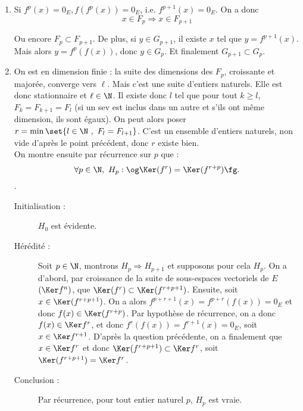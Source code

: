 \begin{enumerate}
\item Si $f^p(x)=0_E, f\left(f^p(x)\right)=0_E$, i.e. $f^{p+1}(x)=0_E$. On a donc
$$
x \in F_p \Longrightarrow x \in F_{p+1}
$$

Ou encore $F_p \subset F_{p+1}$.
De plus, si $y \in G_{p+1}$, il existe $x$ tel que $y=f^{p+1}(x)$. Mais alors $y=f^p(f(x))$, donc $y \in G_p$. Et finalement $G_{p+1} \subset G_p$.
\item On est en dimension finie : la suite des dimensions des $F_p$, croissante et majorée, converge vers $\ell$. Mais c'est une suite d'entiers naturels. Elle est donc stationnaire et $\ell\in\N$. Il existe donc $l$ tel que pour tout $k\geq l$, $F_k=F_{k+1}=F_l$ (si un sev est inclus dans un autre et s'ils ont même dimension, ils sont égaux).
On peut alors poser $r=\min\set{l\in\N\ ,\ F_l=F_{l+1}}$. C'est un ensemble d'entiers naturels, non vide d'après le point précédent, donc $r$ existe bien.\\
On montre ensuite par récurrence sur $p$ que :
      \[ \forall p\in\N,~H_p:\textrm{\og} \Ker(f^r) =\Ker(f^{r+p})\textrm{\fg}.
    \].
    \begin{description}
      \item[Initialisation :] $H_0$ est évidente.
      \item[Hérédité :] Soit $p\in \N$, montrons $H_p\Rightarrow H_{p+1}$ et supposons pour cela $H_p$. On a d'abord, par croissance de la suite de sous-espaces vectoriels de $E$ $(\Ker f^n)$, que $ \Ker(f^r) \subset \Ker(f^{r+p+1})$. Ensuite, soit $x\in\Ker(f^{r+p+1})$. On a alors $f^{p+r+1}(x) = f^{p+r}(f(x)) = 0_E$ et donc $f(x) \in \Ker(f^{r+p})$. Par hypothèse de récurrence, on a donc $f(x) \in \Ker f^r$, et donc $f^{r}(f(x)) = f^{r+1}(x) = 0_E$, soit $x\in\Ker f^{r+1}$. D'après la question précédente, on a finalement que $x\in \Ker f^r$ et donc $\Ker(f^{r+p+1}) \subset \Ker f^r$, soit $\Ker(f^{r+p+1}) = \Ker f^r$.
      \item[Conclusion :] Par récurrence, pour tout entier naturel $p$, $H_p$ est vraie.
    \end{description}



\end{enumerate}
